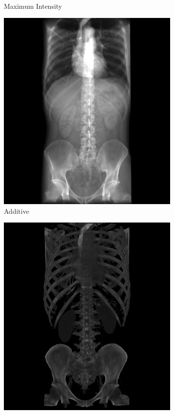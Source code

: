 \begin{figure}[htbp]
\begin{subfigure}{.5\columnwidth}
    \caption{Maximum Intensity}
    \label{fig:blendmax}
  \end{subfigure}
  \begin{subfigure}{.5\columnwidth}   
    \includegraphics[width=\columnwidth]{TorsoBlendingAdditive.png}
    \caption{Additive}
    \label{fig:blendadditive}
  \end{subfigure}%
  \begin{subfigure}{.5\columnwidth}
    \includegraphics[width=\columnwidth]{TorsoBlendingAverage.png}

\end{subfigure}
\end{figure}
